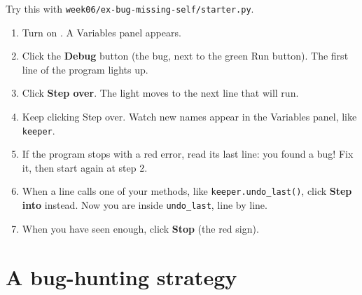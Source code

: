 \begin{workedexample}
Try this with \texttt{week06/ex-bug-missing-self/starter.py}.
\begin{enumerate}[itemsep=1pt]
  \item Turn on . A Variables panel appears.
  \item Click the \textbf{Debug} button (the bug, next to the green Run button). The first line of the program lights up.
  \item Click \textbf{Step over}. The light moves to the next line that will run.
  \item Keep clicking Step over. Watch new names appear in the Variables panel, like \texttt{keeper}.
  \item If the program stops with a red error, read its last line: you found a bug! Fix it, then start again at step 2.
  \item When a line calls one of your methods, like \texttt{keeper.undo\_last()}, click \textbf{Step into} instead. Now you are inside \texttt{undo\_last}, line by line.
  \item When you have seen enough, click \textbf{Stop} (the red sign).
\end{enumerate}
\end{workedexample}

\section{A bug-hunting strategy}
\begin{center}
\end{center}

